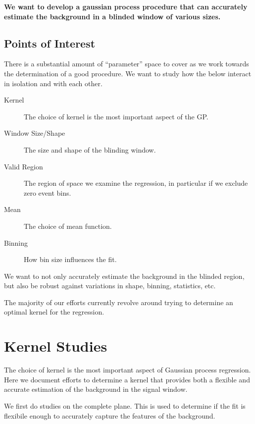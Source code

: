 \documentclass[10pt]{article}
\theoremstyle{definition}
\begin{document}
\textbf{We want to develop a gaussian process procedure that can accurately estimate the background in a blinded window of various sizes.}

\subsection{Points of Interest}

There is a substantial amount of ``parameter'' space to cover as we work towards the determination of a good procedure.
We want to study how the below interact in isolation and with each other.
\begin{description}
\item[Kernel] The choice of kernel is the most important aspect of the GP. 
\item[Window Size/Shape] The size and shape of the blinding window. 
\item[Valid Region] The region of space we examine the regression, in particular if we exclude zero event bins.
\item[Mean] The choice of mean function.
\item[Binning] How bin size influences the fit.
\end{description}

We want to not only accurately estimate the background in the blinded region, but also be robust against variations in shape, binning, statistics, etc.


The majority of our efforts currently revolve around trying to determine an optimal kernel for the regression.


\section{Kernel Studies}
\label{sec:kernel-studies}

The choice of kernel is the most important aspect of Gaussian process regression.
Here we document efforts to determine a kernel that provides both a flexible and accurate estimation of the background in the signal window.

We first do studies on the complete plane. 
This is used to determine if the fit is flexibile enough to accurately capture the features of the background.
\end{document}
